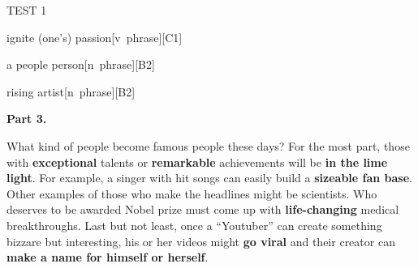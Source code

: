 \begin{glossarymc}[Cambridge 5]
\begin{test}{TEST 1}
\begin{VocabExplain}[Part 2]
            \begin{ExplainCard}{ignite (one’s) passion}[v~phrase][C1]
            \end{ExplainCard}

            \begin{ExplainCard}{a people person}[n~phrase][B2]
            \end{ExplainCard}

            \begin{ExplainCard}{rising artist}[n~phrase][B2]
            \end{ExplainCard}
        \end{VocabExplain}

    \noindent
    \textbf{Part 3.}
    \begin{qa}{What kind of people become famous people these days?}
    For the most part, those with \textbf{exceptional} talents or \textbf{remarkable} achievements will be \textbf{in the lime light}. For example, a singer with hit songs can easily build a \textbf{sizeable fan base}. Other examples of those who make the headlines might be scientists. Who deserves to be awarded Nobel prize must come up with \textbf{life-changing} medical breakthroughs. Last but not least, once a “Youtuber” can create something bizzare but interesting, his or her videos might \textbf{go viral} and their creator can \textbf{make a name for himself or herself}.
    \end{qa}


\end{test}
\end{glossarymc}
